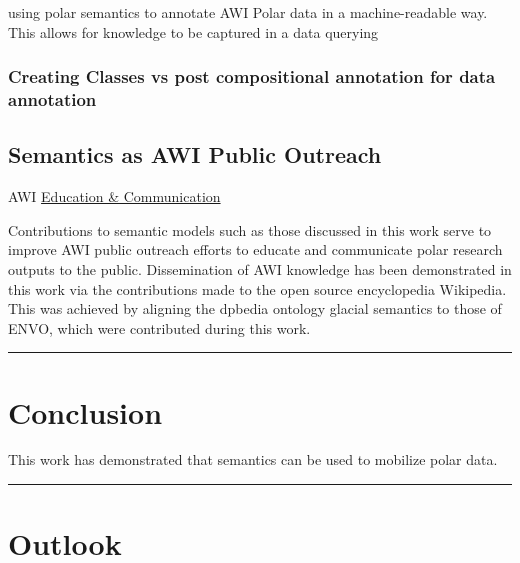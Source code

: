 \documentclass[]{article}
\begin{document}
using polar semantics to annotate AWI Polar data in a machine-readable
way. This allows for knowledge to be captured in a data querying

\hypertarget{creating-classes-vs-post-compositional-annotation-for-data-annotation}{%
\subsubsection{Creating Classes vs post compositional annotation for
data
annotation}\label{creating-classes-vs-post-compositional-annotation-for-data-annotation}}

\hypertarget{semantics-as-awi-public-outreach}{%
\subsection{Semantics as AWI Public
Outreach}\label{semantics-as-awi-public-outreach}}

AWI
\href{https://www.awi.de/en/science/special-groups/bionics/education-communication.html}{Education
\& Communication}

Contributions to semantic models such as those discussed in this work
serve to improve AWI public outreach efforts to educate and communicate
polar research outputs to the public. Dissemination of AWI knowledge has
been demonstrated in this work via the contributions made to the open
source encyclopedia Wikipedia. This was achieved by aligning the dpbedia
ontology glacial semantics to those of ENVO, which were contributed
during this work.

\begin{center}\rule{0.5\linewidth}{\linethickness}\end{center}

\hypertarget{conclusion}{%
\section{Conclusion}\label{conclusion}}

This work has demonstrated that semantics can be used to mobilize polar
data.

\begin{center}\rule{0.5\linewidth}{\linethickness}\end{center}

\hypertarget{outlook}{%
\section{Outlook}\label{outlook}}
\end{document}
